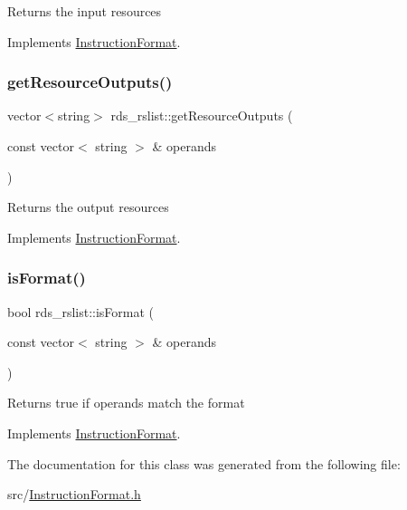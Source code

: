 Returns the input resources 

Implements \hyperlink{classInstructionFormat_a09775d3a3c22f40a0f44504664e586e4}{Instruction\+Format}.

\mbox{\label{classrds__rslist_a495f7309e2936109a910d06d9d19f9f5}} 
\subsubsection{\texorpdfstring{get\+Resource\+Outputs()}{getResourceOutputs()}}
{\footnotesize\ttfamily vector$<$string$>$ rds\+\_\+rslist\+::get\+Resource\+Outputs (\begin{DoxyParamCaption}\item[{const vector$<$ string $>$ \&}]{operands }\end{DoxyParamCaption})\hspace{0.3cm}{\ttfamily [virtual]}}

Returns the output resources 

Implements \hyperlink{classInstructionFormat_a95cd28ffb1bde59b67f676880ab10536}{Instruction\+Format}.

\mbox{\label{classrds__rslist_a3b1c315345a6e795534f04788f810f31}} 
\subsubsection{\texorpdfstring{is\+Format()}{isFormat()}}
{\footnotesize\ttfamily bool rds\+\_\+rslist\+::is\+Format (\begin{DoxyParamCaption}\item[{const vector$<$ string $>$ \&}]{operands }\end{DoxyParamCaption})\hspace{0.3cm}{\ttfamily [virtual]}}

Returns true if operands match the format 

Implements \hyperlink{classInstructionFormat_a9fdcf94dcd7d9a55ba86e7a63f04d1fe}{Instruction\+Format}.



The documentation for this class was generated from the following file\+:\begin{DoxyCompactItemize}
\item 
src/\hyperlink{InstructionFormat_8h}{Instruction\+Format.\+h}\end{DoxyCompactItemize}
